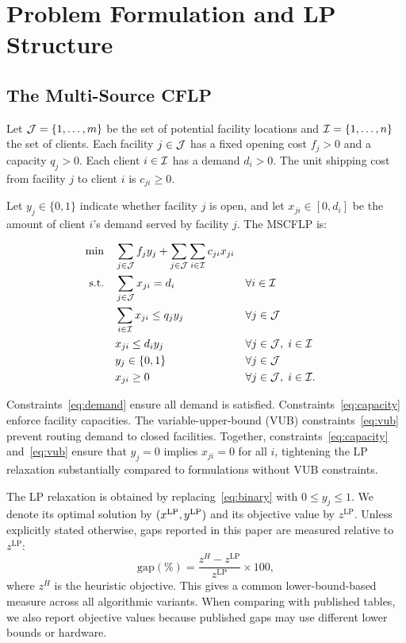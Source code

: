 \section{Problem Formulation and LP Structure}
\label{sec:formulation}

\subsection{The Multi-Source CFLP}

Let $\mathcal{J} = \{1,\ldots,m\}$ be the set of potential facility locations and
$\mathcal{I} = \{1,\ldots,n\}$ the set of clients.
Each facility $j \in \mathcal{J}$ has a fixed opening cost $f_j > 0$ and a capacity
$q_j > 0$.
Each client $i \in \mathcal{I}$ has a demand $d_i > 0$.
The unit shipping cost from facility $j$ to client $i$ is $c_{ji} \geq 0$.

Let $y_j \in \{0,1\}$ indicate whether facility $j$ is open, and let
$x_{ji} \in [0, d_i]$ be the amount of client $i$'s demand served by
facility $j$.
The MSCFLP is:

\begin{align}
  \min \quad & \sum_{j \in \mathcal{J}} f_j y_j
               + \sum_{j \in \mathcal{J}} \sum_{i \in \mathcal{I}} c_{ji} x_{ji}
               \label{eq:obj} \\
  \text{s.t.} \quad
  & \sum_{j \in \mathcal{J}} x_{ji} = d_i
    && \forall i \in \mathcal{I}
    \label{eq:demand} \\
  & \sum_{i \in \mathcal{I}} x_{ji} \leq q_j y_j
    && \forall j \in \mathcal{J}
    \label{eq:capacity} \\
  & x_{ji} \leq d_i y_j
    && \forall j \in \mathcal{J},\; i \in \mathcal{I}
    \label{eq:vub} \\
  & y_j \in \{0,1\}
    && \forall j \in \mathcal{J}
    \label{eq:binary} \\
  & x_{ji} \geq 0
    && \forall j \in \mathcal{J},\; i \in \mathcal{I}.
    \label{eq:nonneg}
\end{align}

Constraints~\eqref{eq:demand} ensure all demand is satisfied.
Constraints~\eqref{eq:capacity} enforce facility capacities.
The variable-upper-bound (VUB) constraints~\eqref{eq:vub} prevent routing
demand to closed facilities.
Together, constraints~\eqref{eq:capacity} and~\eqref{eq:vub} ensure that
$y_j = 0$ implies $x_{ji} = 0$ for all $i$, tightening the LP relaxation
substantially compared to formulations without VUB constraints.

The LP relaxation is obtained by replacing~\eqref{eq:binary} with
$0 \leq y_j \leq 1$.
We denote its optimal solution by $(x^{\text{LP}}, y^{\text{LP}})$ and its objective value
by $z^{\text{LP}}$.
Unless explicitly stated otherwise, gaps reported in this paper are measured
relative to $z^{\text{LP}}$:
\[
  \text{gap}(\%) = \frac{z^H - z^{\text{LP}}}{z^{\text{LP}}} \times 100,
\]
where $z^H$ is the heuristic objective.
This gives a common lower-bound-based measure across all algorithmic variants.
When comparing with published tables, we also report objective values because
published gaps may use different lower bounds or hardware.


